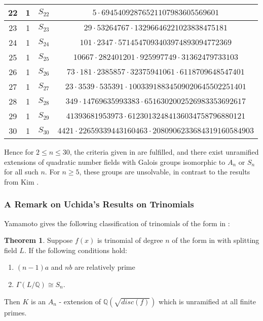 \documentclass[12pt]{extarticle}
\newcommand{\Q}{\mathbb{Q}}
\newcommand{\<}{\langle}
\renewcommand{\>}{\rangle}
\theoremstyle{definition}
\newtheorem{theorem}{Theorem}
\begin{document}
\begin{center}
\begin{tabular}{||c | c | c | c||}
\hline
22 & 1 & $S_{22}$ & $5 \cdot 69454092876521107983605569601$ \\
\hline
23 & 1 & $S_{23}$ & $29 \cdot 53264767 \cdot 13296646221023838475181$ \\
\hline
24 & 1 & $S_{24}$ & $101 \cdot 2347 \cdot 5714547093403974893094772369$ \\
\hline
25 & 1 & $S_{25}$ & $10667 \cdot 282401201 \cdot 925997749 \cdot 31362479733103$ \\
\hline
26 & 1 & $S_{26}$ & $73 \cdot 181 \cdot 2385857 \cdot 32375941061 \cdot 6118709648547401$ \\
\hline
27 & 1 & $S_{27}$ & $23 \cdot 3539 \cdot 535391 \cdot 10033918834509020645502251401$ \\
\hline
28 & 1 & $S_{28}$ & $349 \cdot 14769635993383 \cdot 6516302002526983353692617$ \\
\hline
29 & 1 & $S_{29}$ & $41393681953973 \cdot 61230132484136034758796880121$ \\
\hline
30 & 1 & $S_{30}$ & $4421 \cdot 22659339443160463 \cdot 2080906233684319160584903$ \\
\hline


\end{tabular}
\end{center}


Hence for $2 \leq n \leq 30$, the criteria given in  are fulfilled, and there exist unramified extensions of quadratic number fields with Galois groups isomorphic to $A_n$ or $S_n$ for all such $n$. For $n \geq 5$, these groups are unsolvable, in contrast to the results from Kim \cite{KIM2015}.
\par
\subsubsection*{A Remark on Uchida's Results on Trinomials}
Yamamoto \cite{YAMA1970} gives the following classification of trinomials of the form in :
\begin{theorem}
Suppose $f(x)$ is trinomial of degree $n$ of the form in  with splitting field $L$. If the following conditions hold: 
\begin{enumerate}
    \item $(n-1)a$ and $nb$ are relatively prime 
    \item $\Gamma(L/\Q) \cong S_n$.
\end{enumerate}\par
Then $K$ is an $A_n$ - extension of $\Q\left( \sqrt{disc(f)}\right)$ which is unramified at all finite primes. \label{thm:yama_trinomial}
\end{theorem}
\end{document}
